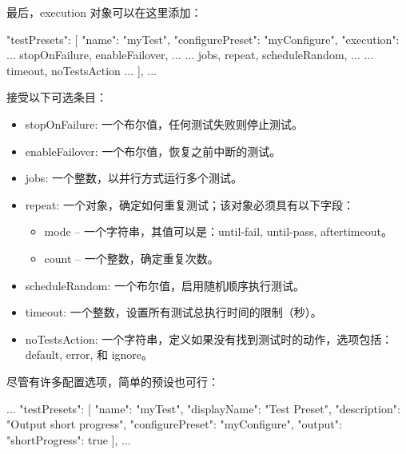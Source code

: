 最后，execution 对象可以在这里添加：

\begin{json}
    "testPresets": [
        {
            "name": "myTest",
            "configurePreset": "myConfigure",
            "execution": {
                ... stopOnFailure, enableFailover, ...
                ... jobs, repeat, scheduleRandom, ...
                ... timeout, noTestsAction ...
            }
        }
    ],
...
\end{json}

接受以下可选条目：

\begin{itemize}
\item
stopOnFailure: 一个布尔值，任何测试失败则停止测试。

\item
enableFailover: 一个布尔值，恢复之前中断的测试。

\item
jobs: 一个整数，以并行方式运行多个测试。

\item
repeat: 一个对象，确定如何重复测试；该对象必须具有以下字段：
\begin{itemize}
\item
mode – 一个字符串，其值可以是：until-fail, until-pass, aftertimeout。

\item
count – 一个整数，确定重复次数。
\end{itemize}

\item
scheduleRandom: 一个布尔值，启用随机顺序执行测试。

\item
timeout: 一个整数，设置所有测试总执行时间的限制（秒）。

\item
noTestsAction: 一个字符串，定义如果没有找到测试时的动作，选项包括：default, error, 和 ignore。
\end{itemize}

尽管有许多配置选项，简单的预设也可行：


\begin{json}
...
"testPresets": [
    {
        "name": "myTest",
        "displayName": "Test Preset",
        "description": "Output short progress",
        "configurePreset": "myConfigure",
        "output": {
            "shortProgress": true
        }
    }
],
...
\end{json}

